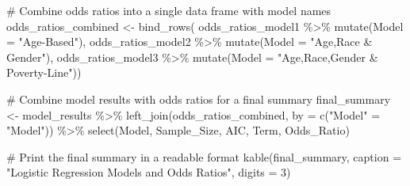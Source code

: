 \documentclass[
  12pt,
]{article}
\newenvironment{Shaded}{\begin{snugshade}}{\end{snugshade}}
\newcommand{\AttributeTok}[1]{\textcolor[rgb]{0.40,0.45,0.13}{#1}}
\newcommand{\CommentTok}[1]{\textcolor[rgb]{0.37,0.37,0.37}{#1}}
\newcommand{\DecValTok}[1]{\textcolor[rgb]{0.68,0.00,0.00}{#1}}
\newcommand{\FunctionTok}[1]{\textcolor[rgb]{0.28,0.35,0.67}{#1}}
\newcommand{\NormalTok}[1]{\textcolor[rgb]{0.00,0.23,0.31}{#1}}
\newcommand{\OtherTok}[1]{\textcolor[rgb]{0.00,0.23,0.31}{#1}}
\newcommand{\SpecialCharTok}[1]{\textcolor[rgb]{0.37,0.37,0.37}{#1}}
\newcommand{\StringTok}[1]{\textcolor[rgb]{0.13,0.47,0.30}{#1}}
\begin{document}
\begin{Shaded}
\begin{Highlighting}[]
\CommentTok{\# Combine odds ratios into a single data frame with model names}
\NormalTok{odds\_ratios\_combined }\OtherTok{\textless{}{-}} \FunctionTok{bind\_rows}\NormalTok{(}
\NormalTok{  odds\_ratios\_model1 }\SpecialCharTok{\%\textgreater{}\%} \FunctionTok{mutate}\NormalTok{(}\AttributeTok{Model =} \StringTok{"Age{-}Based"}\NormalTok{),}
\NormalTok{  odds\_ratios\_model2 }\SpecialCharTok{\%\textgreater{}\%} \FunctionTok{mutate}\NormalTok{(}\AttributeTok{Model =} \StringTok{"Age,Race \& Gender"}\NormalTok{),}
\NormalTok{  odds\_ratios\_model3 }\SpecialCharTok{\%\textgreater{}\%} \FunctionTok{mutate}\NormalTok{(}\AttributeTok{Model =} \StringTok{"Age,Race,Gender \& Poverty{-}Line"}\NormalTok{))}
\end{Highlighting}
\end{Shaded}

\begin{Shaded}
\begin{Highlighting}[]
\CommentTok{\# Combine model results with odds ratios for a final summary}
\NormalTok{final\_summary }\OtherTok{\textless{}{-}}\NormalTok{ model\_results }\SpecialCharTok{\%\textgreater{}\%}
  \FunctionTok{left\_join}\NormalTok{(odds\_ratios\_combined, }\AttributeTok{by =} \FunctionTok{c}\NormalTok{(}\StringTok{"Model"} \OtherTok{=} \StringTok{"Model"}\NormalTok{)) }\SpecialCharTok{\%\textgreater{}\%}
  \FunctionTok{select}\NormalTok{(Model, Sample\_Size, AIC, Term, Odds\_Ratio)}

\CommentTok{\# Print the final summary in a readable format}
\FunctionTok{kable}\NormalTok{(final\_summary, }\AttributeTok{caption =} \StringTok{"Logistic Regression Models and Odds Ratios"}\NormalTok{, }\AttributeTok{digits =} \DecValTok{3}\NormalTok{)}
\end{Highlighting}
\end{Shaded}
\end{document}
